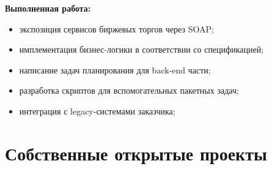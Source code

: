 \documentclass[a4paper, 12pt]{article}
\begin{document}
\begin{itemize}
               \textbf{Выполненная работа:}
			\begin{itemize}
				\item экспозиция сервисов биржевых торгов через SOAP;
  				\item имплементация бизнес-логики в соответствии со спецификацией;
  				\item написание задач планирования для back-end части; 
				\item разработка скриптов для вспомогательных пакетных задач;
				\item интеграция с legacy-системами заказчика;
			\end{itemize}
    \end{itemize}    
    
\section*{Собственные открытые проекты}  
\end{document}
